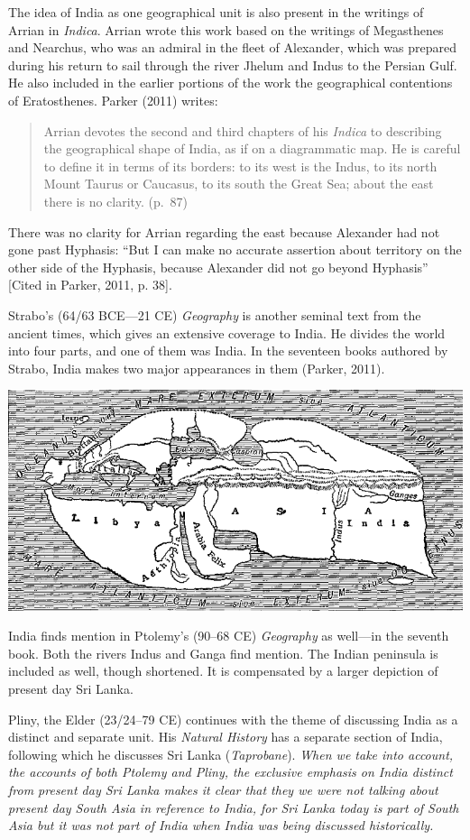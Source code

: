 The idea of India as one geographical unit is also present in the writings of Arrian in \textit{Indica}. Arrian wrote this work based on the writings of Megasthenes and Nearchus, who was an admiral in the fleet of Alexander, which was prepared during his return to sail through the river Jhelum and Indus to the Persian Gulf. He also included in the earlier portions of the work the geographical contentions of Eratosthenes. Parker (2011) writes: 
\begin{quote}
Arrian devotes the second and third chapters of his \textit{Indica} to describing the geographical shape of India, as if on a diagrammatic map. He is careful to define it in terms of its borders: to its west is the Indus, to its north Mount Taurus or Caucasus, to its south the Great Sea; about the east there is no clarity. (p.\ 87) 
\end{quote}
There was no clarity for Arrian regarding the east because Alexander had not gone past Hyphasis: “But I can make no accurate assertion about territory on the other side of the Hyphasis, because Alexander did not go beyond Hyphasis” [Cited in Parker, 2011, p. 38]. 

Strabo’s (64/63 BCE—21 CE) \textit{Geography} is another seminal text from the ancient times, which gives an extensive coverage to India. He divides the world into four parts, and one of them was India. In the seventeen books authored by Strabo, India makes two major appearances in them (Parker, 2011).

\centerline{\includegraphics{figures/appendix-a-fig1.png}}

India finds mention in Ptolemy’s (90--68 CE) \textit{Geography} as well—in the seventh book. Both the rivers Indus and Ganga find mention. The Indian peninsula is included as well, though shortened. It is compensated by a larger depiction of present day Sri Lanka.

Pliny, the Elder (23/24--79 CE) continues with the theme of discussing India as a distinct and separate unit. His \textit{Natural History} has a separate section of India, following which he discusses Sri Lanka (\textit{Taprobane}). \textit{When we take into account, the accounts of both Ptolemy and Pliny, the exclusive emphasis on India distinct from present day Sri Lanka makes it clear that they we were not talking about present day South Asia in reference to India, for Sri Lanka today is part of South Asia but it was not part of India when India was being discussed historically.} 

